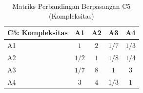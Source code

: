 \begin{table}[H]
	\centering
	\caption{Matriks Perbandingan Berpasangan C5 (Kompleksitas)}
	\label{tab:perbandingan_c5}
	\begin{tabular}{|l|c|c|c|c|}
		\hline
		C5: Kompleksitas & A1 & A2 & A3 & A4 \\ \hline
		A1 & $1$ & $2$ & $1/7$ & $1/3$ \\ \hline
		A2 & $1/2$ & $1$ & $1/8$ & $1/4$ \\ \hline
		A3 & $1/7$ & $8$ & $1$ & $3$ \\ \hline
		A4 & $3$ & $4$ & $1/3$ & $1$ \\ \hline
	\end{tabular}
\end{table}